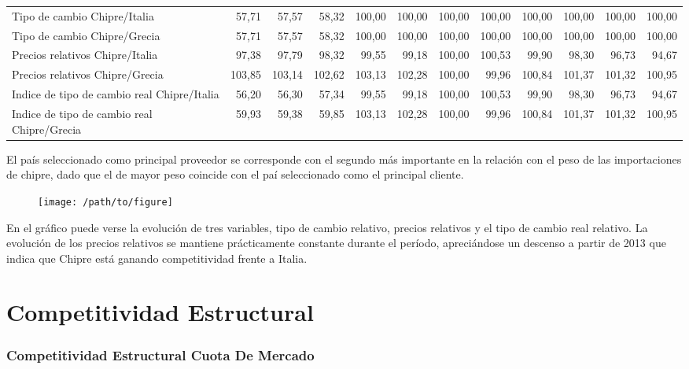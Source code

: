\documentclass[a4paper,openright,12pt]{book}
\begin{document}
\begin{table}[h]
{\begin{tabular}{@{}lrrrrrrrrrrr@{}}
    Tipo de cambio Chipre/Italia                & 57,71  & 57,57  & 58,32  & 100,00 & 100,00 & 100,00 & 100,00 & 100,00 & 100,00 & 100,00 & 100,00 \\
    Tipo de cambio Chipre/Grecia                & 57,71  & 57,57  & 58,32  & 100,00 & 100,00 & 100,00 & 100,00 & 100,00 & 100,00 & 100,00 & 100,00 \\
    Precios relativos Chipre/Italia             & 97,38  & 97,79  & 98,32  & 99,55  & 99,18  & 100,00 & 100,53 & 99,90  & 98,30  & 96,73  & 94,67  \\
    Precios relativos Chipre/Grecia             & 103,85 & 103,14 & 102,62 & 103,13 & 102,28 & 100,00 & 99,96  & 100,84 & 101,37 & 101,32 & 100,95 \\
    Indice de tipo de cambio real Chipre/Italia & 56,20  & 56,30  & 57,34  & 99,55  & 99,18  & 100,00 & 100,53 & 99,90  & 98,30  & 96,73  & 94,67  \\
    Indice de tipo de cambio real Chipre/Grecia & 59,93  & 59,38  & 59,85  & 103,13 & 102,28 & 100,00 & 99,96  & 100,84 & 101,37 & 101,32 & 100,95 \\ \bottomrule
    \end{tabular}
    }
\end{table}

El país seleccionado como principal proveedor se corresponde con el segundo más importante en la relación con el peso de las importaciones de chipre, dado que el de mayor peso coincide con  el paí seleccionado como el principal cliente.

\begin{figure}
    \texttt{[image: /path/to/figure]}
    \caption{}
    \label{}
    \caption{}
\end{figure}

En el gráfico puede verse la evolución de tres variables, tipo de cambio relativo, precios relativos y el tipo de cambio real relativo. La evolución de los precios relativos se mantiene prácticamente constante durante el período, apreciándose un descenso a partir de 2013 que indica que Chipre está ganando competitividad frente a Italia.

\chapter{Competitividad Estructural}
\label{cap5}

\subsection{Competitividad Estructural Cuota De Mercado}
\end{document}
